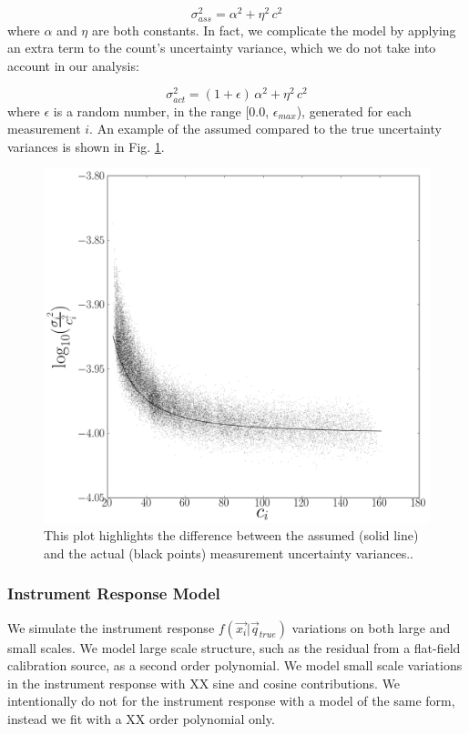 \documentclass[manuscript]{aastex}
\begin{document}
\begin{displaymath}
\sigma_{{ass}}^{2} = \alpha^{2} + \eta^{2}\, c^{2} 
\end{displaymath}
\noindent{}where $\alpha$ and $\eta$ are both constants. In fact, we complicate the model by applying an extra term to the count's uncertainty variance, which we do not take into account in our analysis: 

\begin{displaymath}
\sigma_{{act}}^{2} = (1 + \epsilon) \,\alpha^{2} + \eta^{2}\, c^{2} 
\end{displaymath}
\noindent{}where $\epsilon$ is a random number, in the range [0.0, $\epsilon_{max}$), generated for each measurement $i$. An example of the assumed compared to the true uncertainty variances is shown in Fig. \ref{fig:invvar}.

\begin{figure}[ht]
\begin{center}
\includegraphics[width=\textwidth]{invvar.png}
\end{center}
\caption{This plot highlights the difference between the assumed (solid line) and the actual (black points) measurement uncertainty variances.\label{fig:invvar}.}
\end{figure}

\subsubsection{Instrument Response Model}
We simulate the instrument response $f(\vec{x_i} | \vec{q}_{true})$ variations on both large and small scales. We model large scale structure, such as the residual from a flat-field calibration source, as a second order polynomial. We model small scale variations in the instrument response with XX sine and cosine contributions. We intentionally do not for the instrument response with a model of the same form, instead we fit with a XX order polynomial only. 
\end{document}
